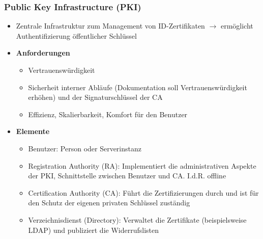 \subsubsection{Public Key Infrastructure (PKI)}
\begin{itemize}
	\item Zentrale Infrastruktur zum Management von ID-Zertifikaten \(\rightarrow\) ermöglicht Authentifizierung öffentlicher Schlüssel
	\item \textbf{Anforderungen}
	\begin{itemize}
		\item Vertrauenswürdigkeit
		\item Sicherheit interner Abläufe (Dokumentation soll Vertrauenswürdigkeit erhöhen) und der Signaturschlüssel der CA
		\item Effizienz, Skalierbarkeit, Komfort für den Benutzer
	\end{itemize}
	\item \textbf{Elemente}
	\begin{itemize}
		\item Benutzer: Person oder Serverinstanz
		\item Registration Authority (RA): Implementiert die administrativen Aspekte der PKI, Schnittstelle zwischen Benutzer und CA. I.d.R. offline
		\item Certification Authority (CA): Führt die Zertifizierungen durch und ist für den Schutz der eigenen privaten Schlüssel zuständig
		\item Verzeichnisdienst (Directory): Verwaltet die Zertifikate (beispielsweise LDAP) und publiziert die Widerrufslisten
	\end{itemize}
\end{itemize}

